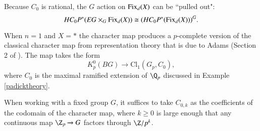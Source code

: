 Because $C_0$ is rational, the $G$ action on $\operatorname{Fix}_d(X)$ can be ``pulled out":
\[
HC_{0}P^*(EG \times_G \operatorname{Fix}_d(X)) \cong (HC_{0}P^*(\operatorname{Fix}_d(X)))^G.
\]



\begin{example}
When $n=1$ and $X = *$ the character map produces a $p$-complete version of the classical character map from representation theory that is due to Adams (Section 2 of \cite{Adams-Maps2}). The map takes the form
\[
K_{p}^{0}(BG) \xrightarrow{} \mathrm{Cl}_1(G_p, C_0),
\]
where $C_0$ is the maximal ramified extension of $\Q_p$ discussed in Example \ref{padicktheory}.
\end{example}

\begin{remark}
When working with a fixed group $G$, it suffices to take $C_{0,k}$ as the coefficients of the codomain of the character map, where $k \geq 0$ is large enough that any continuous map $\Z_p \xrightarrow{} G$ factors through $\Z/p^k$.
\end{remark}


